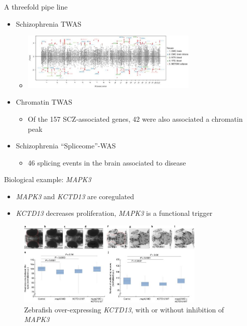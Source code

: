 \documentclass[aspectratio=169,12pt]{beamer}
\begin{document}
\begin{frame}{A threefold pipe line}

	\begin{itemize}
		\item Schizophrenia TWAS
		\begin{itemize}
			\item \includegraphics[width=0.7\textwidth]{gusev2018/2-schizophrenia_TWAS}
		\end{itemize}

		\item Chromatin TWAS
		\begin{itemize}
			\item Of the 157 SCZ-associated genes, 42 were also 
associated a chromatin peak
		\end{itemize}

		\item Schizophrenia \enquote{Spliceome}-WAS
		\begin{itemize}
			\item 46 splicing events in the brain associated to disease
		\end{itemize}
	\end{itemize}

\end{frame}

\begin{frame}{Biological example: \textit{MAPK3}}
	
	\begin{itemize}
		\item \textit{MAPK3} and \textit{KCTD13} are coregulated
		\item \textit{KCTD13} decreases proliferation, \textit{MAPK3} is 
a functional trigger
	\end{itemize}

	\begin{figure}
		\includegraphics[width=0.8\textwidth]{gusev2018/6-zebrafish}
		\caption{Zebrafish over-expressing \textit{KCTD13}, with or 
without inhibition of \textit{MAPK3}}
	\end{figure}


\end{frame}
\end{document}
